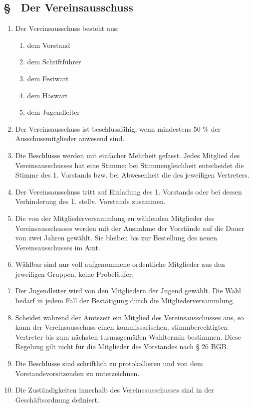 \subsection{§ \thesaparagraphcounter\ Der Vereinsausschuss} \label{sa:par:vereinsausschuss}
\begin{enumerate}
    \item \label{sa:abs:g0t862} Der Vereinsausschuss besteht aus:
    \begin{enumerate}
        \item dem Vorstand
        \item dem Schriftführer
        \item dem Festwart
        \item dem Häswart
        \item dem Jugendleiter
    \end{enumerate}
    
    \item \label{sa:abs:4i2i0m} Der Vereinsausschuss ist beschlussfähig, wenn mindestens 50 \% der Ausschussmitglieder anwesend sind.

    \item \label{sa:abs:btj8qo} Die Beschlüsse werden mit einfacher Mehrheit gefasst. Jedes Mitglied des Vereinsausschusses hat eine Stimme; bei Stimmengleichheit entscheidet die Stimme des 1. Vorstands bzw. bei Abwesenheit die des jeweiligen Vertreters.

    \item \label{sa:abs:vcy6pw} Der Vereinsausschuss tritt auf Einladung des 1. Vorstands oder bei dessen Verhinderung des 1. stellv. Vorstands zusammen.

    \item \label{sa:abs:mr3izn} Die von der Mitgliederversammlung zu wählenden Mitglieder des Vereinsausschusses werden mit der Ausnahme der Vorstände auf die Dauer von zwei Jahren gewählt. Sie bleiben bis zur Bestellung des neuen Vereinsausschusses im Amt.

    \item \label{sa:abs:bdpl93} Wählbar sind nur voll aufgenommene ordentliche Mitglieder aus den jeweiligen Gruppen, keine Probeläufer.

    \item \label{sa:abs:8xdq1y} Der Jugendleiter wird von den Mitgliedern der Jugend gewählt. Die Wahl bedarf in jedem Fall der Bestätigung durch die Mitgliederversammlung.

    \item \label{sa:abs:twd2t7} Scheidet während der Amtszeit ein Mitglied des Vereinsausschusses aus, so kann der Vereinsausschuss einen kommissarischen, stimmberechtigten Vertreter bis zum nächsten turnusgemäßen Wahltermin bestimmen. Diese Regelung gilt nicht für die Mitglieder des Vorstandes nach § 26 BGB.

    \item \label{sa:abs:2r5bdi} Die Beschlüsse sind schriftlich zu protokollieren und von dem Vorstandsvorsitzenden zu unterzeichnen.

    \item \label{sa:abs:qrjyxj} Die Zuständigkeiten innerhalb des Vereinsausschusses sind in der Geschäftsordnung definiert. 
\end{enumerate}

